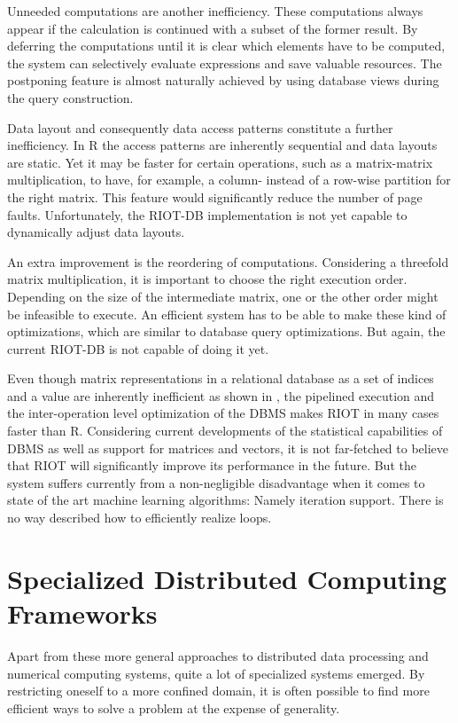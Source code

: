 Unneeded computations are another inefficiency. These computations always appear if the calculation is continued with a subset of the former result.
By deferring the computations until it is clear which elements have to be computed,
the system can selectively evaluate expressions and save valuable resources.
The postponing feature is almost naturally achieved by using database views during the query construction.

Data layout and consequently data access patterns constitute a further inefficiency.
In R the access patterns are inherently sequential and data layouts are static.
Yet it may be faster for certain operations, such as a matrix-matrix multiplication, to have, for example, a column- instead of a row-wise partition for the right matrix.
This feature would significantly reduce the number of page faults.
Unfortunately, the RIOT-DB implementation is not yet capable to dynamically adjust data layouts.

An extra improvement is the reordering of computations.
Considering a threefold matrix multiplication, it is important to choose the right execution order.
Depending on the size of the intermediate matrix, one or the other order might be infeasible to execute.
An efficient system has to be able to make these kind of optimizations, which are similar to database query optimizations.
But again, the current RIOT-DB is not capable of doing it yet.

Even though matrix representations in a relational database as a set of indices and a value are inherently inefficient as shown in \cite{stonebraker:2007a}, the pipelined execution and the inter-operation level optimization of the DBMS makes RIOT in many cases faster than R.
Considering current developments of the statistical capabilities of DBMS as well as support for matrices and vectors, it is not far-fetched to believe that RIOT will significantly improve its performance in the future.
But the system suffers currently from a non-negligible disadvantage when it comes to state of the art machine learning algorithms: Namely iteration support.
There is no way described how to efficiently realize loops.

\section{Specialized Distributed Computing Frameworks}

Apart from these more general approaches to distributed data processing and numerical computing systems, quite a lot of specialized systems emerged.
By restricting oneself to a more confined domain, it is often possible to find more efficient ways to solve a problem at the expense of generality.

